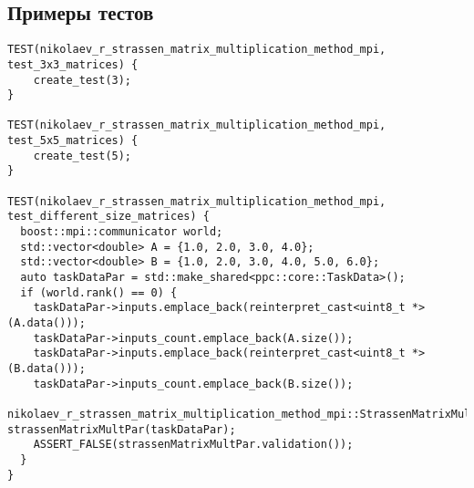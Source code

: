 \documentclass[a4paper,12pt]{article}
\begin{document}
\subsection{Примеры тестов}
\lstset{language=C++, basicstyle=\footnotesize\ttfamily, frame=single, captionpos=b, numbers=left, numberstyle=\tiny, stepnumber=1, numbersep=5pt, tabsize=2, breaklines=true, breakatwhitespace=false, showspaces=false, showstringspaces=false}
\begin{lstlisting}[caption={Тесты функций из func\_tests/main.cpp}]
TEST(nikolaev_r_strassen_matrix_multiplication_method_mpi, test_3x3_matrices) {
    create_test(3);
}

TEST(nikolaev_r_strassen_matrix_multiplication_method_mpi, test_5x5_matrices) {
    create_test(5);
}

TEST(nikolaev_r_strassen_matrix_multiplication_method_mpi, test_different_size_matrices) {
  boost::mpi::communicator world;
  std::vector<double> A = {1.0, 2.0, 3.0, 4.0};
  std::vector<double> B = {1.0, 2.0, 3.0, 4.0, 5.0, 6.0};
  auto taskDataPar = std::make_shared<ppc::core::TaskData>();
  if (world.rank() == 0) {
    taskDataPar->inputs.emplace_back(reinterpret_cast<uint8_t *>(A.data()));
    taskDataPar->inputs_count.emplace_back(A.size());
    taskDataPar->inputs.emplace_back(reinterpret_cast<uint8_t *>(B.data()));
    taskDataPar->inputs_count.emplace_back(B.size());
    nikolaev_r_strassen_matrix_multiplication_method_mpi::StrassenMatrixMultiplicationParallel strassenMatrixMultPar(taskDataPar);
    ASSERT_FALSE(strassenMatrixMultPar.validation());
  }
}
\end{lstlisting}
\end{document}
